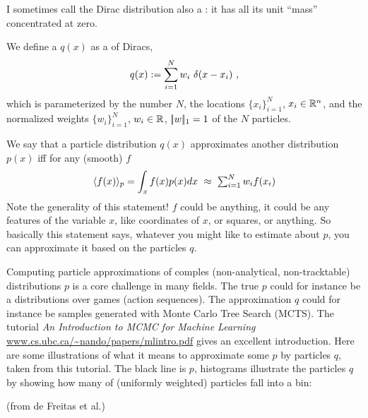 I sometimes call the Dirac distribution also a : it has all its unit ``mass'' concentrated at zero.

\begin{myDefinition}
We define a  $q(x)$ as
a  of Diracs,
\begin{equation}
q(x) := \sum_{i=1}^N w_i~ \delta(x-x_i) ~,
\end{equation}
which is parameterized by the number $N$, the locations $\{
x_i \}_{i=1}^N$, $x_i \in{\mathbb{R}}^n$, and the normalized weights $\{
w_i \}_{i=1}^N$, $w_i \in{\mathbb{R}}$, $|\!|w|\!|_1 = 1$ of the $N$ particles.
\end{myDefinition}

We say that a particle distribution $q(x)$ approximates another
distribution $p(x)$ iff for any (smooth) $f$
\begin{equation}
\langle f(x)\rangle_p = \int_x f(x) p(x) dx ~\approx~ \textstyle\sum_{i=1}^N w_i f(x_i)
\end{equation}
Note the generality of this statement! $f$ could be anything, it could
be any features of the variable $x$, like coordinates of $x$, or
squares, or anything. So basically this statement says, whatever you
might like to estimate about $p$, you can approximate it based on the
particles $q$.

Computing particle approximations of comples (non-analytical,
non-tracktable) distributions $p$ is a core challenge in many
fields. The true $p$ could for instance be a distributions over games
(action sequences). The approximation $q$ could for instance be
samples generated with Monte Carlo Tree Search (MCTS). The
tutorial \emph{An Introduction to MCMC for Machine
Learning} \url{www.cs.ubc.ca/~nando/papers/mlintro.pdf} gives an
excellent introduction. Here are some illustrations of what it means
to approximate some $p$ by particles $q$, taken from this
tutorial. The black line is $p$, histograms illustrate the particles
$q$ by showing how many of (uniformly weighted) particles fall into a
bin:

(from de Freitas et al.)



